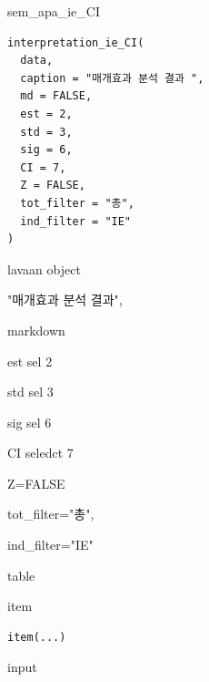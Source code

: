 \documentclass[a4paper]{book}
\begin{document}
%
\begin{Description}
sem\_apa\_ie\_CI
\end{Description}
%
\begin{Usage}
\begin{verbatim}
interpretation_ie_CI(
  data,
  caption = "매개효과 분석 결과 ",
  md = FALSE,
  est = 2,
  std = 3,
  sig = 6,
  CI = 7,
  Z = FALSE,
  tot_filter = "총",
  ind_filter = "IE"
)
\end{verbatim}
\end{Usage}
%
\begin{Arguments}
\begin{ldescription}
\item[\code{data}] lavaan object

\item[\code{caption}] "매개효과 분석 결과",

\item[\code{md}] markdown

\item[\code{est}] est sel 2

\item[\code{std}] std sel 3

\item[\code{sig}] sig sel 6

\item[\code{CI}] CI seledct 7

\item[\code{Z}] Z=FALSE

\item[\code{tot\_filter}] tot\_filter="총",

\item[\code{ind\_filter}] ind\_filter="IE"
\end{ldescription}
\end{Arguments}
%
\begin{Value}
table
\end{Value}
%
\begin{Description}
item
\end{Description}
%
\begin{Usage}
\begin{verbatim}
item(...)
\end{verbatim}
\end{Usage}
%
\begin{Arguments}
\begin{ldescription}
\item[\code{...}] input
\end{ldescription}
\end{Arguments}
\end{document}
